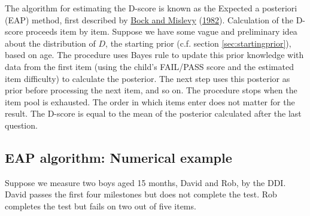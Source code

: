 \documentclass[
]{book}
\begin{document}
The algorithm for estimating the D-score is known as the Expected a posteriori (EAP) method, first described by \protect\hyperlink{ref-bock1982}{Bock and Mislevy} (\protect\hyperlink{ref-bock1982}{1982}). Calculation of the D-score proceeds item by item. Suppose we have some vague and preliminary idea about the distribution of \(D\), the starting prior (c.f. section \ref{sec:startingprior}), based on age. The procedure uses Bayes rule to update this prior knowledge with data from the first item (using the child's FAIL/PASS score and the estimated item difficulty) to calculate the posterior. The next step uses this posterior as prior before processing the next item, and so on. The procedure stops when the item pool is exhausted. The order in which items enter does not matter for the result. The D-score is equal to the mean of the posterior calculated after the last question.

\hypertarget{eap-algorithm-numerical-example}{%
\subsection{EAP algorithm: Numerical example}\label{eap-algorithm-numerical-example}}

Suppose we measure two boys aged 15 months, David and Rob, by the DDI. David passes the first four milestones but does not complete the test. Rob completes the test but fails on two out of five items.

\begin{table}

\caption{\label{tab:datadavidandrob}Scores of David and Rob on five milestones from the DDI}
\centering
{}
\end{table}
\end{document}
